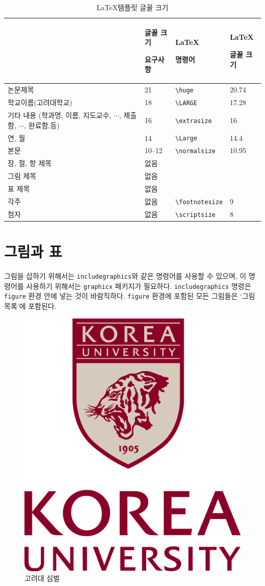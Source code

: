 \begin{table}
\caption{\LaTeX 템플릿 글꼴 크기}\label{tab:font size}
\bigskip
\begin{tabular}{>{\centering\arraybackslash}p{5.4cm}p{2.4cm}p{2.5cm}p{1.6cm}}
\toprule
&글꼴 크기 \par 요구사항 & \LaTeX \par 명령어 & \LaTeX \par 글꼴 크기 \\\midrule
논문제목			&21&\verb|\huge| & 20.74 \\\midrule
학교이름(고려대학교)
					&18&\verb|\LARGE| & 17.28 \\\midrule
기타 내용 (학과명, 이름, 지도교수, \(\cdots\), 제출함, \(\cdots\), 완료함,등)	
					&16&\verb|\extrasize| & 16  \\\midrule
연, 월	&14&\verb|\Large| & 14.4 \\\midrule
본문			&10--12&\verb|\normalsize| & 10.95 \\\midrule
장, 절, 항 제목				&없음&\\\midrule
그림 제목			&없음&\\\midrule
표 제목			&없음&\\\midrule
각주 			&없음&\verb|\footnotesize| & 9 \\\midrule
첨자 			&없음&\verb|\scriptsize| & 8 \\\bottomrule


\end{tabular}
\end{table}



\newpage
\section{그림과 표}\label{sec:figures_and_table}

그림을 삽하기 위해서는 \texttt{includegraphics}와 같은 명령어를 사용할 수 있으며, 이 명령어를 사용하기 위해서는 \texttt{graphicx} 패키지가 필요하다.
\texttt{includegraphics} 명령은 \texttt{figure} 환경 안에 넣는 것이 바람직하다.
\texttt{figure} 환경에 포함된 모든 그림들은 `그림 목록'에 포함된다.

\renewcommand\figurename{그림}
\begin{figure}
\begin{center}
\vspace{0.5cm}
\includegraphics[width=.2\textwidth]{figures/kumark.png}
\end{center}
\caption{고려대 심벌}
\end{figure}

